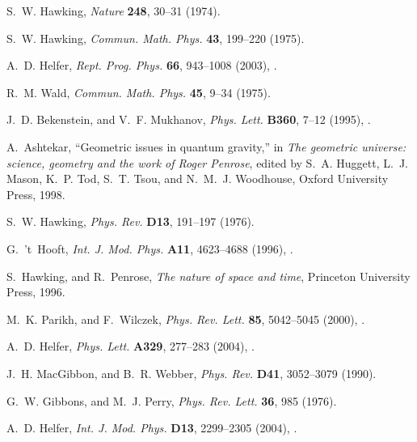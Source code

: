 \documentclass[
%
draft    %
,numberedheadings 
,bibliocites
  ]
  {aipproc}
\begin{document}
\begin{thebibliography}{57}
S.~W. Hawking, \emph{Nature} \textbf{248}, 30--31 (1974).

S.~W. Hawking, \emph{Commun. Math. Phys.} \textbf{43}, 199--220 (1975).

A.~D. Helfer, \emph{Rept. Prog. Phys.} \textbf{66}, 943--1008 (2003),
  .

R.~M. Wald, \emph{Commun. Math. Phys.} \textbf{45}, 9--34 (1975).

J.~D. Bekenstein, and V.~F. Mukhanov, \emph{Phys. Lett.} \textbf{B360}, 7--12
  (1995), .

A.~Ashtekar, \enquote{Geometric issues in quantum gravity,} in \emph{The
  geometric universe: science, geometry and the work of Roger Penrose}, edited
  by S.~A. Huggett, L.~J. Mason, K.~P. Tod, S.~T. Tsou, and N.~M.~J. Woodhouse,
  Oxford University Press, 1998.

S.~W. Hawking, \emph{Phys. Rev.} \textbf{D13}, 191--197 (1976).

G.~'t~Hooft, \emph{Int. J. Mod. Phys.} \textbf{A11}, 4623--4688 (1996),
  .

S.~Hawking, and R.~Penrose, \emph{The nature of space and time}, Princeton
  University Press, 1996.

M.~K. Parikh, and F.~Wilczek, \emph{Phys. Rev. Lett.} \textbf{85}, 5042--5045
  (2000), .

A.~D. Helfer, \emph{Phys. Lett.} \textbf{A329}, 277--283 (2004{}),
  .

J.~H. MacGibbon, and B.~R. Webber, \emph{Phys. Rev.} \textbf{D41}, 3052--3079
  (1990).

G.~W. Gibbons, and M.~J. Perry, \emph{Phys. Rev. Lett.} \textbf{36}, 985
  (1976).

A.~D. Helfer, \emph{Int. J. Mod. Phys.} \textbf{D13}, 2299--2305
  (2004{}), .


\end{thebibliography}
\end{document}
